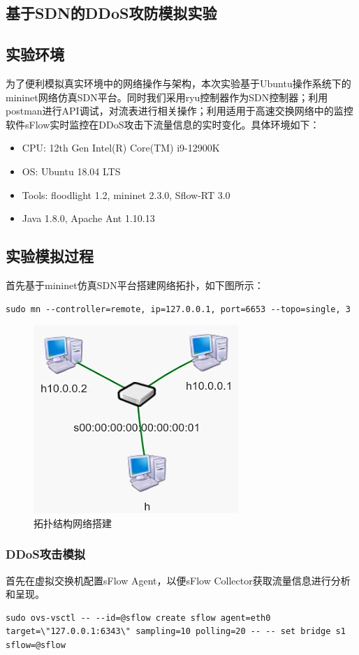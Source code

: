 \begin{multicols}{2}
\section{基于SDN的DDoS攻防模拟实验}
\subsection{实验环境}
为了便利模拟真实环境中的网络操作与架构，本次实验基于Ubuntu操作系统下的mininet网络仿真SDN平台。同时我们采用ryu控制器作为SDN控制器；利用postman进行API调试，对流表进行相关操作；利用适用于高速交换网络中的监控软件sFlow实时监控在DDoS攻击下流量信息的实时变化。具体环境如下：
\begin{itemize}
	\item CPU: 12th Gen Intel(R) Core(TM) i9-12900K
	\item OS: Ubuntu 18.04 LTS
	\item Tools: floodlight 1.2, mininet 2.3.0, Sflow-RT 3.0
	\item Java 1.8.0, Apache Ant 1.10.13
\end{itemize}
\subsection{实验模拟过程}
首先基于mininet仿真SDN平台搭建网络拓扑，如下图所示：
\begin{lstlisting}
sudo mn --controller=remote, ip=127.0.0.1, port=6653 --topo=single, 3
\end{lstlisting}
\begin{figure}[H]
	\centering
	\includegraphics[width=0.55\linewidth]{pics/screenshot001}
	\caption{拓扑结构网络搭建}
	\label{fig:screenshot001}
\end{figure}
\subsubsection{DDoS攻击模拟}
首先在虚拟交换机配置sFlow Agent，以便sFlow Collector获取流量信息进行分析和呈现。
\begin{lstlisting}
sudo ovs-vsctl -- --id=@sflow create sflow agent=eth0 target=\"127.0.0.1:6343\" sampling=10 polling=20 -- -- set bridge s1 sflow=@sflow
\end{lstlisting}
\end{multicols}
